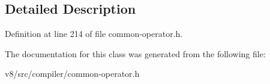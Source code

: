 \subsection{Detailed Description}


Definition at line 214 of file common-\/operator.\+h.



The documentation for this class was generated from the following file\+:\begin{DoxyCompactItemize}
\item 
v8/src/compiler/common-\/operator.\+h\end{DoxyCompactItemize}
